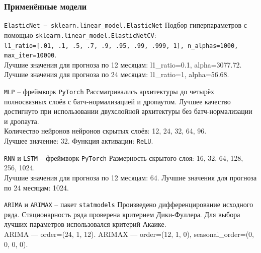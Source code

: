 \documentclass[aspectratio=169,8pt]{beamer}
\begin{document}
\begin{frame}
\frametitle{Применённые модели}
\begin{block}{\texttt{ElasticNet -- sklearn.linear\_model.ElasticNet}}
Подбор гиперпараметров с помощью \texttt{sklearn.linear\_model.ElasticNetCV}:\\
\texttt{l1\_ratio=[.01, .1, .5, .7, .9, .95, .99, .999, 1], n\_alphas=1000, max\_iter=10000}.\\
Лучшие значения для прогноза по 12 месяцам: l1\_ratio=0.1, alpha=3077.72.\\
Лучшие значения для прогноза по 24 месяцам: l1\_ratio=1, alpha=56.68.
\end{block}

\begin{block}{\texttt{MLP} -- фреймворк \texttt{PyTorch}}
Рассматривались архитектуры до четырёх полносвязных слоёв с батч-нормализацией и дропаутом. Лучшее качество достигнуто при использовании двухслойной архитектуры без батч-нормализации и дропаута.\\
Количество нейронов  нейронов скрытых слоёв: 12, 24, 32, 64, 96.\\
Лучшее значение: 32. Функция активации: \texttt{ReLU}.
\end{block}

\begin{block}{\texttt{RNN} и \texttt{LSTM} -- фреймворк \texttt{PyTorch}}
Размерность скрытого слоя: 16, 32, 64, 128, 256, 1024.\\
Лучшие значения для прогноза по 12 месяцам: 64. Лучшие значения для прогноза по 24 месяцам: 1024.
\end{block}

\begin{block}{\texttt{ARIMA} и \texttt{ARIMAX} -- пакет \texttt{statmodels}}
Произведено дифференцирование исходного ряда. Стационарность ряда проверена критерием Дики-Фуллера. Для выбора лучших параметров использовался критерий Акаике.\\
ARIMA --- order=(24, 1, 12). ARIMAX --- order=(12, 1, 0), seasonal\_order=(0, 0, 0, 0).
\end{block}


\end{frame}
\end{document}
